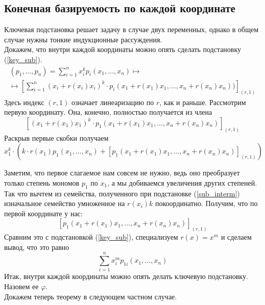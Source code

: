 \documentclass[12pt,a4paper]{article}
\begin{document}
    \subsection{Конечная базируемость по каждой координате}
    Ключевая подстановка решает задачу в случае двух переменных, однако в общем случае нужны тонкие индукционные рассуждения.\\
    Докажем, что внутри каждой координаты можно опять сделать подстановку (\ref{key_sub}).
    \begin{multline*}
    (p_1,...,p_n)
        =\sum\limits_{i=1}^n x^k_i p_i(x_1,\ldots,x_n)\mapsto\\\mapsto [\sum\limits_{i=1}^n (x_i+r(x_i)x_i)^k\cdot p_i(x_1+r(x_1)x_1,\ldots,x_n+r(x_n)x_n))]_{(r,1)}
    \end{multline*}Здесь индекс $(r,1)$ означает линеаризацию по $r$, как и раньше. Рассмотрим первую координату. Она, конечно, полностью получается из члена
    $$[(x_1+r(x_1)x_1)^k\cdot p_1(x_1+r(x_1)x_1,\ldots,x_n+r(x_n)x_n)]_{(r,1)}$$Раскрыв первые скобки получаем
    \begin{equation}
        \label{sub_interm}
        x_1^k\cdot(k\cdot r(x_1) p_1(x_1,\ldots,x_n)+ [p_1(x_1+r(x_1)x_1,\ldots,x_n+r(x_n)x_n)]_{(r,1)})
    \end{equation}

    Заметим, что первое слагаемое нам совсем не нужно, ведь оно преобразует только степень мономов $p_1$ по $x_1$, а мы добиваемся увеличения других степеней. Так что вычтем из семейства, полученного при подстановке (\ref{sub_interm}) изначальное семейство умноженное на $r(x_i)k$ покоординатно. Получим, что по первой координате у нас:
    $$[p_1(x_1+r(x_1)x_1,\ldots,x_n+r(x_n)x_n)]_{(r,1)}$$Сравним это с подстановкой (\ref{key_sub}), специализуем $r(x)=x^m$ и сделаем вывод, что это равно
    \begin{equation}
        \label{key_inside}
        \sum\limits_{i=1}^n x_i^m p_{1i}(x_1,\ldots,x_n)
    \end{equation}
    Итак, внутри каждой координаты можно опять делать ключевую подстановку. Назовем ее $\varphi$.\\
    Докажем теперь теорему в следующем частном случае.
\end{document}
